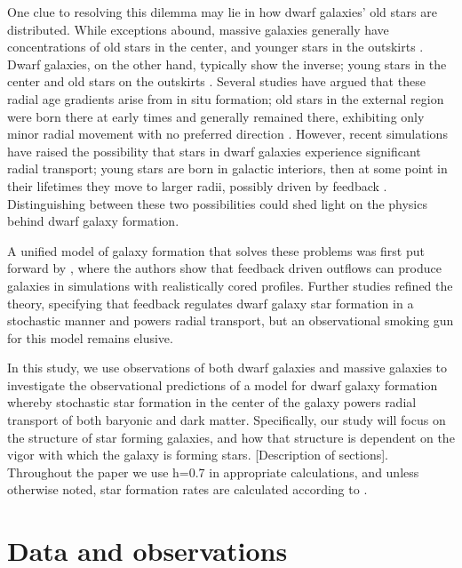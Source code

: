 \documentclass[iop]{emulateapj}
\begin{document}
One clue to resolving this dilemma may lie in how dwarf galaxies' old stars are distributed. While exceptions abound, massive galaxies generally have concentrations of old stars in the center, and younger stars in the outskirts \citep{dejong96,Bakos08}. Dwarf galaxies, on the other hand, typically show the inverse; young stars in the center and old stars on the outskirts \citep{Hidalgo09,Hidalgo13}. Several studies have argued that these radial age gradients arise from in situ formation; old stars in the external region were born there at early times and generally remained there, exhibiting only minor radial movement with no preferred direction \citep{Stinson09,Schroyen13}. However, recent simulations have raised the possibility that stars in dwarf galaxies experience significant radial transport; young stars are born in galactic interiors, then at some point in their lifetimes they move to larger radii, possibly driven by feedback \citep{Gonz16,EB17}. Distinguishing between these two possibilities could shed light on the physics behind dwarf galaxy formation.

A unified model of galaxy formation that solves these problems was first put forward by \cite{Navarro96}, where the authors show that feedback driven outflows can produce galaxies in simulations with realistically cored profiles. Further studies \citep{Governato10,Governato12,Maxwell12,DC14,Pontzen14,Chan15,EB17} refined the theory, specifying that feedback regulates dwarf galaxy star formation in a stochastic manner and powers radial transport, but an observational smoking gun for this model remains elusive. 

In this study, we use observations of both dwarf galaxies and massive galaxies to investigate the observational predictions of a model for dwarf galaxy formation whereby stochastic star formation in the center of the galaxy powers radial transport of both baryonic and dark matter. Specifically, our study will focus on the structure of star forming galaxies, and how that structure is dependent on the vigor with which the galaxy is forming stars. [Description of sections]. Throughout the paper we use h=0.7 in appropriate calculations, and unless otherwise noted, star formation rates are calculated according to \cite{KS98}. 

\section{Data and observations}
\label{sec:obs}
\end{document}
